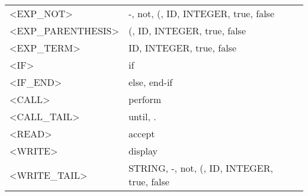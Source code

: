 \documentclass[a4paper,11pt]{article}
\begin{document}
\begin{longtable}{l>{\raggedright}p{6cm}p{6cm}}
	<EXP\_NOT> & -, not, (, ID, INTEGER, true, false & \\
	<EXP\_PARENTHESIS> & (, ID, INTEGER, true, false & \\
	<EXP\_TERM> & ID, INTEGER, true, false & \\
	<IF> & if & \\
	<IF\_END> & else, end-if & \\
	<CALL> & perform & \\
	<CALL\_TAIL> & until, . & \\
	<READ> & accept & \\
	<WRITE> & display & \\
	<WRITE\_TAIL> & STRING, -, not, (, ID, INTEGER, true, false & \\


\end{longtable}
\end{document}

